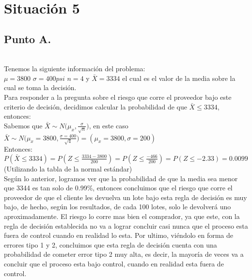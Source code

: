 \documentclass[letterpaper,12pt,onecolumn,titlepage]{article}
\begin{document}
\pagebreak\section{Situaci\'{o}n 5}
\subsection{Punto A.}
~\\ Tenemos la siguiente informaci\'{o}n del problema:
~\\ $\mu=3800$  $\sigma=400psi$ $n=4$ y $\bar{X}=3334$ el cual es el valor de la media sobre la cual se toma la decisi\'{o}n.
~\\ Para responder a la pregunta sobre el riesgo que corre el proveedor bajo este criterio de decisi\'{o}n, decidimos calcular la probabilidad de que $\bar{X}\leq3334$, entonces:
~\\ Sabemos que $\bar{X}\sim{N(\mu_x,\frac{\sigma}{\sqrt{n}}})$, en este caso $\bar{X}\sim{N(\mu_x=3800,\frac{\sigma=400}{\sqrt{4}}})=(\mu_x=3800,\sigma=200)$
~\\Entonces:
~\\ $P(\bar{X}\leq3334)=P(Z\leq\frac{3334-3800}{200})=P(Z\leq\frac{-466}{200})=P(Z\leq-2.33)=0.0099$ (Utilizando la tabla de la normal est\'{a}ndar)
~\\Seg\'{u}n lo anterior, logramos ver que la probabilidad de que la media sea menor que 3344 es tan solo de 0.99\%, entonces concluimos que el riesgo que corre el proveedor de que el cliente les devuelva un lote bajo esta regla de decisi\'{o}n es muy bajo, de hecho, seg\'{u}n los resultados, de cada 100 lotes, solo le devolver\'{a} uno aproximadamente. El riesgo lo corre mas bien el comprador, ya que este, con la regla de decisi\'{o}n establecida no va a lograr concluir casi nunca que el proceso esta fuera de control cuando en realidad lo esta. Por ultimo, vi\'{e}ndolo en forma de errores tipo 1 y 2, concluimos que esta regla de decisi\'{o}n cuenta con una probabilidad de cometer error tipo 2 muy alta, es decir, la mayor\'{i}a de veces va a concluir que el proceso esta bajo control, cuando en realidad esta fuera de control.
\end{document}
